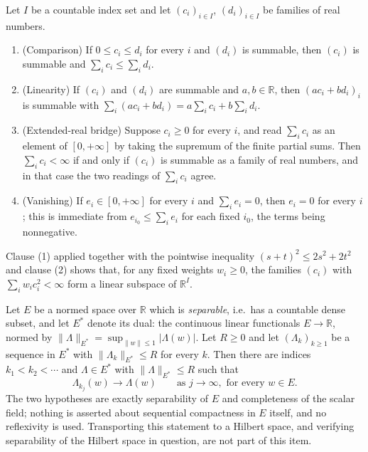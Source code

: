 \begin{proposition}
Let $I$ be a countable index set and let $(c_i)_{i\in I}$, $(d_i)_{i \in I}$ be
families of real numbers.
\begin{enumerate}
\item (Comparison) If $0 \leq c_i \leq d_i$ for every $i$ and $(d_i)$ is
summable, then $(c_i)$ is summable and $\sum_i c_i \leq \sum_i d_i$.
\item (Linearity) If $(c_i)$ and $(d_i)$ are summable and $a, b \in \mathbb{R}$,
then $(a c_i + b d_i)_{i}$ is summable with
$\sum_i (a c_i + b d_i) = a\sum_i c_i + b \sum_i d_i$.
\item (Extended-real bridge) Suppose $c_i \geq 0$ for every $i$, and read
$\sum_i c_i$ as an element of $[0,+\infty]$ by taking the supremum of the finite
partial sums.  Then $\sum_i c_i < \infty$ if and only if $(c_i)$ is summable as a
family of real numbers, and in that case the two readings of $\sum_i c_i$ agree.
\item (Vanishing) If $e_i \in [0,+\infty]$ for every $i$ and
$\sum_i e_i = 0$, then $e_i = 0$ for every $i$; this is immediate from
$e_{i_0} \leq \sum_i e_i$ for each fixed $i_0$, the terms being nonnegative.
\end{enumerate}
Clause (1) applied together with the pointwise inequality
$(s+t)^2 \leq 2s^2 + 2t^2$ and clause (2) shows that, for any fixed weights
$w_i \geq 0$, the families $(c_i)$ with $\sum_i w_i c_i^2 < \infty$ form a linear
subspace of $\mathbb{R}^I$.
\end{proposition}
\begin{proposition}
Let $E$ be a normed space over $\mathbb{R}$ which is \emph{separable}, i.e.\ has
a countable dense subset, and let $E^*$ denote its dual: the continuous linear
functionals $E \to \mathbb{R}$, normed by
$\|\Lambda\|_{E^*} = \sup_{\|w\| \leq 1} |\Lambda(w)|$.  Let $R \geq 0$ and let
$(\Lambda_k)_{k \geq 1}$ be a sequence in $E^*$ with $\|\Lambda_k\|_{E^*} \leq R$
for every $k$.  Then there are indices $k_1 < k_2 < \cdots$ and
$\Lambda \in E^*$ with $\|\Lambda\|_{E^*} \leq R$ such that
\[
  \Lambda_{k_j}(w) \longrightarrow \Lambda(w)
  \qquad\text{as } j \to \infty, \text{ for every } w \in E .
\]
The two hypotheses are exactly separability of $E$ and completeness of the
scalar field; nothing is asserted about sequential compactness in $E$ itself, and
no reflexivity is used.  Transporting this statement to a Hilbert space, and
verifying separability of the Hilbert space in question, are not part of this
item.
\end{proposition}
